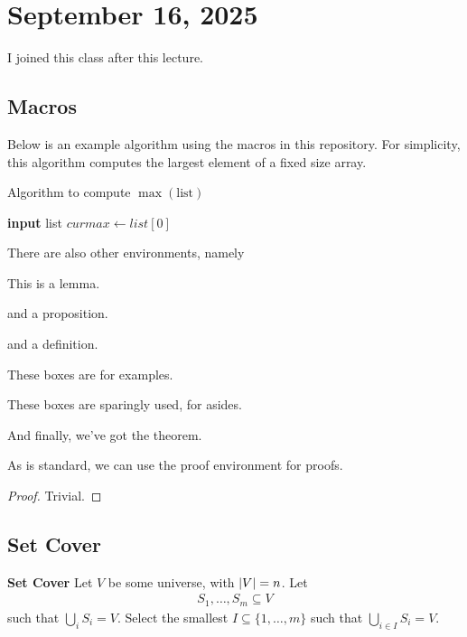 \section{September 16, 2025}
I joined this class after this lecture. 

\subsection{Macros}
Below is an example algorithm using the macros in this repository. For simplicity, this algorithm computes the largest element of a fixed size array.

\begin{algorithm}[H]
    \caption{Algorithm to compute $\max(\text{list})$}
    \DontPrintSemicolon
    \textbf{input} list\;
    $curmax \leftarrow list[0]$\;
\end{algorithm}

There are also other environments, namely
\begin{lemma}
    This is a lemma.
\end{lemma}
\begin{proposition}
    and a proposition.
\end{proposition}
\begin{definition}
    and a definition.
\end{definition}
\begin{example}
    These boxes are for examples.
\end{example}
\begin{aside}
    These boxes are sparingly used, for asides.
\end{aside}
\begin{theorem}
    And finally, we've got the theorem.
\end{theorem}
As is standard, we can use the proof environment for proofs.
\begin{proof}
    Trivial.
\end{proof}

\subsection{Set Cover}
\begin{definition}
    \textbf{Set Cover} Let $V$ be some universe, with $\abs{V} = n$. Let
    \begin{align}
        S_1, \ldots, S_m \subseteq V
    \end{align}
    such that $\bigcup_i S_i = V$. Select the smallest $I \subseteq \{ 1, \ldots, m \}$ such that $\bigcup_{i \in I} S_i = V$.
\end{definition}

